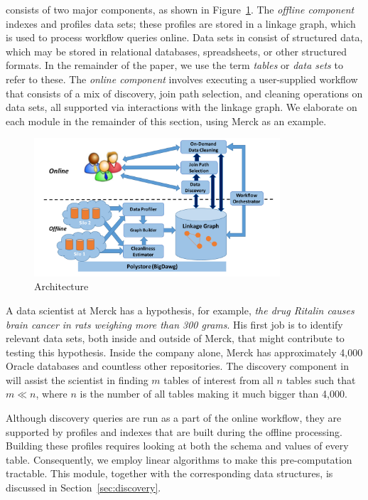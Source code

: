 \dcv consists of two major components, as shown in 
Figure~\ref{fig:arch}.  
The {\it offline component} indexes and profiles data sets;  these profiles are stored  in a linkage graph, which is used to process workflow queries online. 
Data sets in \dcv consist of structured data, which may be stored in relational databases, spreadsheets, or other structured formats. In the remainder of the paper, we use the term {\it tables} or {\it data sets} to refer to these.
The {\it online component} involves executing a user-supplied workflow that consists of a mix of discovery, join path selection, and cleaning operations on data sets, all supported via interactions with the linkage graph. We elaborate on each module in the remainder of this section, using Merck as an example.


\begin{figure}[!t]
\includegraphics[width=3.6in]{arch3.pdf}
\caption{\dcv Architecture}
\label{fig:arch}
\end{figure}


\stitle{[Discovery.]} 
A data scientist at Merck has a hypothesis, for example, {\it the drug Ritalin causes brain cancer in rats weighing more than 300 grams}.
His first job is to identify relevant data sets, both inside and outside of Merck, that might contribute to testing this hypothesis. Inside the company alone, Merck has approximately 4,000 Oracle databases and countless other repositories. The discovery component in \dcv will assist the scientist in finding $m$ tables of interest from all $n$ tables such that $m \ll n$, where $n$ is the number of all tables making it much bigger than 4,000.  

Although discovery queries are run as a part of the online workflow, they are supported by profiles and indexes that are built during the offline processing.  Building these profiles requires looking at both the schema and values of every table. Consequently, we employ linear algorithms to make this pre-computation tractable. This module, together with the corresponding data structures, is discussed in Section~\ref{sec:discovery}.

